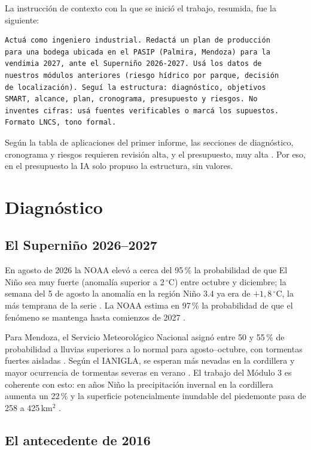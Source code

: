 \documentclass[runningheads]{llncs}
\begin{document}
La instrucción de contexto con la que se inició el trabajo, resumida, fue la siguiente:

\begin{verbatim}
Actuá como ingeniero industrial. Redactá un plan de producción
para una bodega ubicada en el PASIP (Palmira, Mendoza) para la
vendimia 2027, ante el Superniño 2026-2027. Usá los datos de
nuestros módulos anteriores (riesgo hídrico por parque, decisión
de localización). Seguí la estructura: diagnóstico, objetivos
SMART, alcance, plan, cronograma, presupuesto y riesgos. No
inventes cifras: usá fuentes verificables o marcá los supuestos.
Formato LNCS, tono formal.
\end{verbatim}

Según la tabla de aplicaciones del primer informe, las secciones de diagnóstico, cronograma y riesgos requieren revisión alta, y el presupuesto, muy alta \cite{informeia}. Por eso, en el presupuesto la IA solo propuso la estructura, sin valores.

\section{Diagnóstico}

\subsection{El Superniño 2026--2027}

En agosto de 2026 la NOAA elevó a cerca del 95\,\% la probabilidad de que El Niño sea muy fuerte (anomalía superior a 2\,$^\circ$C) entre octubre y diciembre; la semana del 5 de agosto la anomalía en la región Niño 3.4 ya era de $+1{,}8\,^\circ$C, la más temprana de la serie \cite{noaa}. La NOAA estima en 97\,\% la probabilidad de que el fenómeno se mantenga hasta comienzos de 2027 \cite{smn}.

Para Mendoza, el Servicio Meteorológico Nacional asignó entre 50 y 55\,\% de probabilidad a lluvias superiores a lo normal para agosto--octubre, con tormentas fuertes aisladas \cite{smn}. Según el IANIGLA, se esperan más nevadas en la cordillera y mayor ocurrencia de tormentas severas en verano \cite{ianigla}. El trabajo del Módulo 3 es coherente con esto: en años Niño la precipitación invernal en la cordillera aumenta un 22\,\% y la superficie potencialmente inundable del piedemonte pasa de 258 a 425\,km$^2$ \cite{sig}.

\subsection{El antecedente de 2016}
\end{document}
